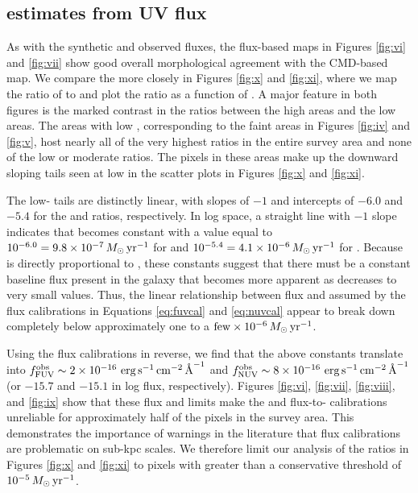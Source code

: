 \documentclass[iop, tighten]{emulateapj}
\begin{document}



\subsection{\sfr{} estimates from UV flux}\label{discussion:sfrs}

\figx

\figxi

As with the synthetic and observed fluxes, the flux-based \sfr{} maps in Figures
\ref{fig:vi} and \ref{fig:vii} show good overall morphological agreement with
the CMD-based \sfroneh{} map. We compare the  more closely in Figures
\ref{fig:x} and \ref{fig:xi}, where we map the ratio of \sfrx{} to \sfroneh{}
and plot the \sfr{} ratio as a function of \sfroneh{}. A major feature in both
figures is the marked contrast in the ratios between the high \sfr{} areas and
the low \sfr{} areas. The areas with low \sfroneh{}, corresponding to the faint
areas in Figures \ref{fig:iv} and \ref{fig:v}, host nearly all of the very
highest \sfr{} ratios in the entire survey area and none of the low or moderate
ratios. The pixels in these areas make up the downward sloping tails seen at low
\sfroneh{} in the scatter plots in Figures \ref{fig:x} and \ref{fig:xi}.

The low-\sfr{} tails are distinctly linear, with slopes of $-1$ and intercepts
of $-6.0$ and $-5.4$ for the \fuv{} and \nuv{} \sfr{} ratios, respectively. In
log space, a straight line with $-1$ slope indicates that \sfrx{} becomes
constant with a value equal to $10^{-6.0} = 9.8\times 10^{-7}\,M_\odot\,\mathrm{yr}^{-1}$ for
\fuv{} and $10^{-5.4} = 4.1\times 10^{-6}\,M_\odot\,\mathrm{yr}^{-1}$ for \nuv{}. Because
\sfrx{} is directly proportional to \fxobs{}, these \sfr{} constants suggest
that there must be a constant baseline flux present in the galaxy that becomes
more apparent as \sfroneh{} decreases to very small values. Thus, the linear
relationship between flux and \sfr{} assumed by the flux calibrations in
Equations \ref{eq:fuvcal} and \ref{eq:nuvcal} appear to break down completely
below \sfroneh{} approximately one to a $\mathrm{few} \times
10^{-6}\,M_\odot\,\mathrm{yr}^{-1}$.

Using the flux calibrations in reverse, we find that the above \sfr{} constants
translate into $f_{\mathrm{FUV}}^{\mathrm{obs}} \sim 2\times 10^{-16}\, \,\mathrm{erg}\,\mathrm{s}^{-1}\,\mathrm{cm}^{-2}\,\textrm{\AA}^{-1}$ and $f_{\mathrm{NUV}}^{\mathrm{obs}} \sim
8\times 10^{-16}\, \,\mathrm{erg}\,\mathrm{s}^{-1}\,\mathrm{cm}^{-2}\,\textrm{\AA}^{-1}$ (or $-15.7$ and $-15.1$ in log flux, respectively).
Figures  \ref{fig:vi}, \ref{fig:vii}, \ref{fig:viii}, and \ref{fig:ix} show that
these flux and \sfr{} limits make the \fuv{} and \nuv{} flux-to-\sfr{}
calibrations unreliable for approximately half of the pixels in the survey area.
This demonstrates the importance of warnings in the literature
\citep[e.g.,][]{Murphy:2011,Kennicutt:2012,Leroy:2012} that flux calibrations
are problematic on sub-kpc scales. We therefore limit our analysis of the \sfr{}
ratios in Figures \ref{fig:x} and \ref{fig:xi} to pixels with \sfroneh{} greater
than a conservative threshold of $10^{-5}\,M_\odot\,\mathrm{yr}^{-1}$.
\end{document}
